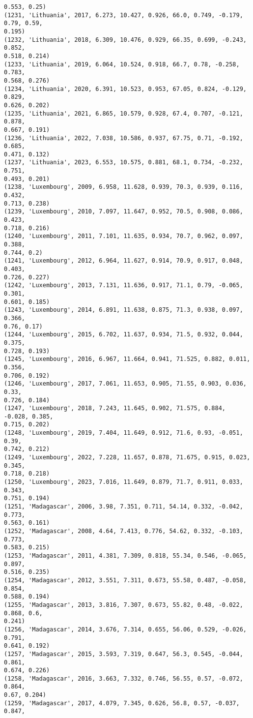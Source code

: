 \documentclass[11pt]{article}
\begin{document}
\begin{Verbatim}[commandchars=\\\{\}]
0.553, 0.25)
(1231, 'Lithuania', 2017, 6.273, 10.427, 0.926, 66.0, 0.749, -0.179, 0.79, 0.59,
0.195)
(1232, 'Lithuania', 2018, 6.309, 10.476, 0.929, 66.35, 0.699, -0.243, 0.852,
0.518, 0.214)
(1233, 'Lithuania', 2019, 6.064, 10.524, 0.918, 66.7, 0.78, -0.258, 0.783,
0.568, 0.276)
(1234, 'Lithuania', 2020, 6.391, 10.523, 0.953, 67.05, 0.824, -0.129, 0.829,
0.626, 0.202)
(1235, 'Lithuania', 2021, 6.865, 10.579, 0.928, 67.4, 0.707, -0.121, 0.878,
0.667, 0.191)
(1236, 'Lithuania', 2022, 7.038, 10.586, 0.937, 67.75, 0.71, -0.192, 0.685,
0.471, 0.132)
(1237, 'Lithuania', 2023, 6.553, 10.575, 0.881, 68.1, 0.734, -0.232, 0.751,
0.493, 0.201)
(1238, 'Luxembourg', 2009, 6.958, 11.628, 0.939, 70.3, 0.939, 0.116, 0.432,
0.713, 0.238)
(1239, 'Luxembourg', 2010, 7.097, 11.647, 0.952, 70.5, 0.908, 0.086, 0.423,
0.718, 0.216)
(1240, 'Luxembourg', 2011, 7.101, 11.635, 0.934, 70.7, 0.962, 0.097, 0.388,
0.744, 0.2)
(1241, 'Luxembourg', 2012, 6.964, 11.627, 0.914, 70.9, 0.917, 0.048, 0.403,
0.726, 0.227)
(1242, 'Luxembourg', 2013, 7.131, 11.636, 0.917, 71.1, 0.79, -0.065, 0.301,
0.601, 0.185)
(1243, 'Luxembourg', 2014, 6.891, 11.638, 0.875, 71.3, 0.938, 0.097, 0.366,
0.76, 0.17)
(1244, 'Luxembourg', 2015, 6.702, 11.637, 0.934, 71.5, 0.932, 0.044, 0.375,
0.728, 0.193)
(1245, 'Luxembourg', 2016, 6.967, 11.664, 0.941, 71.525, 0.882, 0.011, 0.356,
0.706, 0.192)
(1246, 'Luxembourg', 2017, 7.061, 11.653, 0.905, 71.55, 0.903, 0.036, 0.33,
0.726, 0.184)
(1247, 'Luxembourg', 2018, 7.243, 11.645, 0.902, 71.575, 0.884, -0.028, 0.385,
0.715, 0.202)
(1248, 'Luxembourg', 2019, 7.404, 11.649, 0.912, 71.6, 0.93, -0.051, 0.39,
0.742, 0.212)
(1249, 'Luxembourg', 2022, 7.228, 11.657, 0.878, 71.675, 0.915, 0.023, 0.345,
0.718, 0.218)
(1250, 'Luxembourg', 2023, 7.016, 11.649, 0.879, 71.7, 0.911, 0.033, 0.343,
0.751, 0.194)
(1251, 'Madagascar', 2006, 3.98, 7.351, 0.711, 54.14, 0.332, -0.042, 0.773,
0.563, 0.161)
(1252, 'Madagascar', 2008, 4.64, 7.413, 0.776, 54.62, 0.332, -0.103, 0.773,
0.583, 0.215)
(1253, 'Madagascar', 2011, 4.381, 7.309, 0.818, 55.34, 0.546, -0.065, 0.897,
0.516, 0.235)
(1254, 'Madagascar', 2012, 3.551, 7.311, 0.673, 55.58, 0.487, -0.058, 0.854,
0.588, 0.194)
(1255, 'Madagascar', 2013, 3.816, 7.307, 0.673, 55.82, 0.48, -0.022, 0.868, 0.6,
0.241)
(1256, 'Madagascar', 2014, 3.676, 7.314, 0.655, 56.06, 0.529, -0.026, 0.791,
0.641, 0.192)
(1257, 'Madagascar', 2015, 3.593, 7.319, 0.647, 56.3, 0.545, -0.044, 0.861,
0.674, 0.226)
(1258, 'Madagascar', 2016, 3.663, 7.332, 0.746, 56.55, 0.57, -0.072, 0.864,
0.67, 0.204)
(1259, 'Madagascar', 2017, 4.079, 7.345, 0.626, 56.8, 0.57, -0.037, 0.847,

\end{Verbatim}
\end{document}
